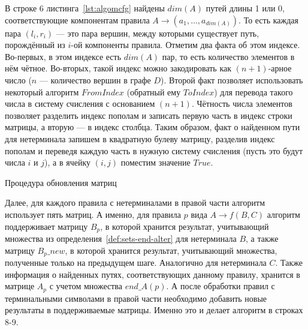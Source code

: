 В строке 6 листинга~\ref{lst:algomcfg} найдены $dim(A)$ путей длины 1 или 0, соответствующие компонентам правила $A \rightarrow (a_1, \dots, a_{dim(A)})$. То есть каждая пара $(l_i, r_i)$ --- это пара вершин, между которыми существует путь, порождённый из $i$-ой компоненты правила. Отметим два факта об этом индексе. Во-первых, в этом индексе есть $dim(A)$ пар, то есть количество элементов в нём чётное. Во-вторых, такой индекс можно закодировать как $(n+1)$-арное число ($n$ --- количество вершин в графе $D$). Второй факт позволяет использовать некоторый алгоритм $FromIndex$ (обратный ему $ToIndex$) для перевода такого числа в систему счисления с основанием $(n+1)$. Чётность числа элементов позволяет разделить индекс пополам и записать первую часть в индекс строки матрицы, а вторую --- в индекс столбца. Таким образом, факт о найденном пути для нетерминала запишем в квадратную булеву матрицу, разделив индекс пополам и переведя каждую часть в нужную систему счисления (пусть это будут числа $i$ и $j$), а в ячейку $(i, j)$ поместим значение $True$.


\begin{algorithm}[H]
	\footnotesize
	\begin{algorithmic}[1]
		\caption{Процедура обновления матриц}
		\label{lst:algomcfg2}
		
		\EndFor
		
		\EndFor
		\EndFor
		
		\EndFor
		
		\EndFor
		\EndFor
		\EndProcedure
		
	\end{algorithmic}
\end{algorithm}

Далее, для каждого правила с нетерминалами в правой части алгоритм использует пять матриц. А именно, для правила $p$ вида $A \rightarrow f(B, C)$ алгоритм поддерживает матрицу $B_p$, в которой хранится результат, учитывающий множества из определения~\ref{def:sets-end-alter} для нетерминала $B$, а также матрицу $B_p\_new$, в которой хранится результат, учитывающий множества, полученные только на предыдущем шаге. Аналогично для нетерминала $C$. Также информация о найденных путях, соответствующих данному правилу, хранится в матрице $A_p$ с учетом множества $end\_A(p)$. А после обработки правил с терминальными символами в правой части необходимо добавить новые результаты в поддерживаемые матрицы. Именно это и делает алгоритм в строках 8-9.

